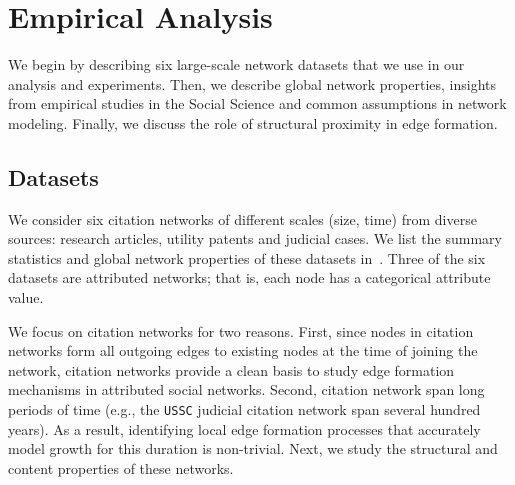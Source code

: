 
\section{Empirical Analysis}
\label{sec:Analysis}

We begin by describing six large-scale network datasets that we
use in our analysis and experiments. Then, we describe global network properties,
insights from empirical studies in the Social Science and common assumptions in
network modeling. Finally, we discuss the role of structural proximity in edge
formation.

\subsection{Datasets}
\label{sec:Datasets}

We consider six citation networks of different scales (size, time) from diverse
sources: research articles, utility patents and judicial cases. We list the
summary statistics and global network properties of these datasets in~.
Three of the six datasets are attributed networks; that is, each node has a categorical attribute value.

We focus on citation networks for two reasons. First, since nodes in citation networks form
all outgoing edges to existing nodes at the time of joining the network,
citation networks provide a clean basis to study edge formation mechanisms in
attributed social networks. Second, citation network span long periods of time (e.g.,
the \texttt{USSC} judicial citation network span several hundred years).
As a result, identifying local edge formation processes that accurately model
growth for this duration is non-trivial. Next, we study the structural and content
properties of these networks.

